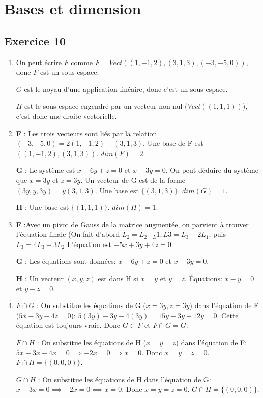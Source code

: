 \documentclass[french]{yLectureNote}
\begin{document}
\section{Bases et dimension}

\subsection{Exercice 10}
\begin{enumerate}
    \item On peut écrire $F$ comme $F=Vect((1,-1,2), (3,1,3), (-3,-5,0))$, donc $F$ est un sous-espace.

    $G$ est le noyau d'une application linéaire, donc c'est un sous-espace.

    $H$ est le sous-espace engendré par un vecteur non nul (\(Vect((1,1,1))\)), c'est donc une droite vectorielle.
    \item \textbf{F} : Les trois vecteurs sont liés par la relation $(-3,-5,0) = 2(1,-1,2)-(3,1,3)$. Une base de F est $((1,-1,2), (3,1,3))$. $dim(F)=2$.

    \textbf{G} : Le système est $x-6y+z=0$ et $x-3y=0$. On peut déduire du système que $x=3y$ et $z=3y$. Un vecteur de G est de la forme $(3y,y,3y)=y(3,1,3)$. Une base est $\{(3,1,3)\}$. $dim(G)=1$.

    \textbf{H} : Une base est $\{(1,1,1)\}$. $dim(H)=1$.
    \item \textbf{F} :Avec un pivot de Gauss de la matrice augmentée, on parvient à trouver l'équation finale (On fait d'abord \(L_2 = L_2+_L1, L3=L_3-2L_1\), puis \(L_3=4L_3-3L_2\) L'équation est $-5x+3y+4z=0$.

    \textbf{G} : Les équations sont données: $x-6y+z=0$ et $x-3y=0$.

    \textbf{H} : Un vecteur $(x,y,z)$ est dans H si $x=y$ et $y=z$. Équations: $x-y=0$ et $y-z=0$.
    \item \textbf{$F\cap G$} : On substitue les équations de G ($x=3y, z=3y$) dans l'équation de F ($5x-3y-4z=0$): $5(3y)-3y-4(3y)=15y-3y-12y=0$. Cette équation est toujours vraie. Donc $G\subset F$ et $F\cap G=G$.

    \textbf{$F\cap H$} : On substitue les équations de H ($x=y=z$) dans l'équation de F: $5x-3x-4x=0 \implies -2x=0 \implies x=0$. Donc $x=y=z=0$. $F\cap H=\{(0,0,0)\}$.

    \textbf{$G\cap H$} : On substitue les équations de H dans l'équation de G: $x-3x=0 \implies -2x=0 \implies x=0$. Donc $x=y=z=0$. $G\cap H=\{(0,0,0)\}$.
\end{enumerate}
\end{document}

